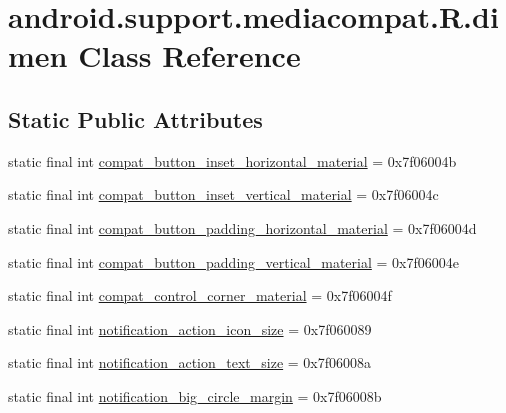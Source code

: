 \hypertarget{classandroid_1_1support_1_1mediacompat_1_1_r_1_1dimen}{}\section{android.\+support.\+mediacompat.\+R.\+dimen Class Reference}
\label{classandroid_1_1support_1_1mediacompat_1_1_r_1_1dimen}
\subsection*{Static Public Attributes}
\begin{DoxyCompactItemize}
\item 
static final int \mbox{\hyperlink{classandroid_1_1support_1_1mediacompat_1_1_r_1_1dimen_ad6ff66f1800984a096c0a55c434a9486}{compat\+\_\+button\+\_\+inset\+\_\+horizontal\+\_\+material}} = 0x7f06004b
\item 
static final int \mbox{\hyperlink{classandroid_1_1support_1_1mediacompat_1_1_r_1_1dimen_a6dd6d3b3976d0fa8c44f539d3e9ce70b}{compat\+\_\+button\+\_\+inset\+\_\+vertical\+\_\+material}} = 0x7f06004c
\item 
static final int \mbox{\hyperlink{classandroid_1_1support_1_1mediacompat_1_1_r_1_1dimen_acd4c21fca839a6bb992fd727bb02475e}{compat\+\_\+button\+\_\+padding\+\_\+horizontal\+\_\+material}} = 0x7f06004d
\item 
static final int \mbox{\hyperlink{classandroid_1_1support_1_1mediacompat_1_1_r_1_1dimen_aca6269683da6ebf6dc233c647b0933aa}{compat\+\_\+button\+\_\+padding\+\_\+vertical\+\_\+material}} = 0x7f06004e
\item 
static final int \mbox{\hyperlink{classandroid_1_1support_1_1mediacompat_1_1_r_1_1dimen_ab7fbc1e088495ccf22a768d3f60157ee}{compat\+\_\+control\+\_\+corner\+\_\+material}} = 0x7f06004f
\item 
static final int \mbox{\hyperlink{classandroid_1_1support_1_1mediacompat_1_1_r_1_1dimen_a49eb463381ecb66c8859f7233b82a771}{notification\+\_\+action\+\_\+icon\+\_\+size}} = 0x7f060089
\item 
static final int \mbox{\hyperlink{classandroid_1_1support_1_1mediacompat_1_1_r_1_1dimen_ae700ffb5ba9baa3d0291c61f99924beb}{notification\+\_\+action\+\_\+text\+\_\+size}} = 0x7f06008a
\item 
static final int \mbox{\hyperlink{classandroid_1_1support_1_1mediacompat_1_1_r_1_1dimen_a7f5b9cf74bb168113f90762fab15254d}{notification\+\_\+big\+\_\+circle\+\_\+margin}} = 0x7f06008b

\end{DoxyCompactItemize}
